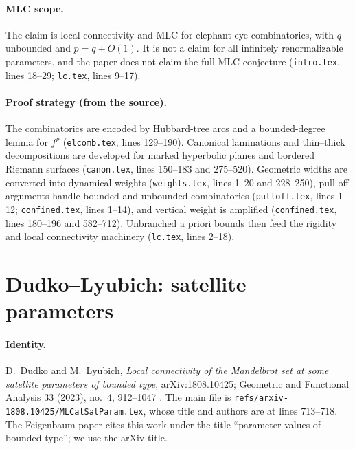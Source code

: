 \paragraph{MLC scope.}
The claim is local connectivity and MLC for elephant-eye combinatorics, with $q$ unbounded and
$p=q+O(1)$.  It is not a claim for all infinitely renormalizable parameters, and the paper does not claim
the full MLC conjecture (\texttt{intro.tex}, lines 18--29; \texttt{lc.tex}, lines 9--17).

\paragraph{Proof strategy (from the source).}
The combinatorics are encoded by Hubbard-tree arcs and a bounded-degree lemma for $f^p$
(\texttt{elcomb.tex}, lines 129--190).  Canonical laminations and thin--thick decompositions are
developed for marked hyperbolic planes and bordered Riemann surfaces (\texttt{canon.tex}, lines 150--183
and 275--520).  Geometric widths are converted into dynamical weights (\texttt{weights.tex}, lines 1--20 and
228--250), pull-off arguments handle bounded and unbounded combinatorics (\texttt{pulloff.tex}, lines 1--12;
\texttt{confined.tex}, lines 1--14), and vertical weight is amplified (\texttt{confined.tex}, lines 180--196 and
582--712).  Unbranched a priori bounds then feed the rigidity and local connectivity machinery
(\texttt{lc.tex}, lines 2--18).

\section{Dudko--Lyubich: satellite parameters}
\label{sec:dl-satellite}

\paragraph{Identity.}
D.~Dudko and M.~Lyubich, \emph{Local connectivity of the Mandelbrot set at some satellite parameters of
bounded type}, arXiv:1808.10425; Geometric and Functional Analysis 33 (2023), no.~4, 912--1047
\cite{DudkoLyubichSatellite}.  The main file is \texttt{refs/arxiv-1808.10425/MLCatSatParam.tex}, whose title
and authors are at lines 713--718.  The Feigenbaum paper cites this work under the title
``parameter values of bounded type''; we use the arXiv title.

